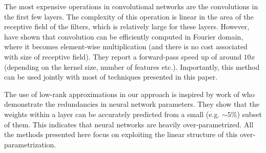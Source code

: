 


The most expensive operations in convolutional networks are the
convolutions in the first few layers. The complexity of this operation
is linear in the area of the receptive field of the filters, which is
relatively large for these layers.  However, \cite{mathieu2013fast} have shown that convolution can be
efficiently computed in Fourier domain, where it becomes element-wise
multiplication (and there is no cost associated with size of receptive
field). They report a forward-pass speed up of around $10x$ (depending on
the kernel size, number of features etc.).  Importantly, this method can
be used jointly with most of techniques presented in this paper.

The use of low-rank approximations in our approach is inspired by work
of \cite{denil2013predicting} who demonstrate the redundancies in neural
network parameters. They show that the weights within a layer can be
accurately predicted from a small (e.g. $\sim 5\%$) subset of them. This
indicates that neural networks are heavily over-parametrized.  All the
methods presented here focus on exploiting the linear structure of this
over-parametrization.
